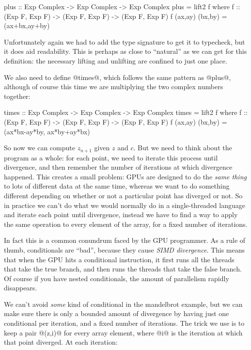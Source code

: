 \begin{haskell}
plus :: Exp Complex -> Exp Complex -> Exp Complex
plus = lift2 f
  where f :: (Exp F, Exp F) -> (Exp F, Exp F) -> (Exp F, Exp F)
        f (ax,ay) (bx,by) = (ax+bx,ay+by)
\end{haskell}

\noindent Unfortunately again we had to add the type signature to get
it to typecheck, but it does aid readability.  This is perhaps as
close to ``natural'' as we can get for this definition: the necessary
lifting and unlifting are confined to just one place.

We also need to define @times@, which follows the same pattern as
@plus@, although of course this time we are multiplying the two
complex numbers together:

\begin{haskell}
times :: Exp Complex -> Exp Complex -> Exp Complex
times = lift2 f
  where f :: (Exp F, Exp F) -> (Exp F, Exp F) -> (Exp F, Exp F)
        f (ax,ay) (bx,by)   =  (ax*bx-ay*by, ax*by+ay*bx)
\end{haskell}

So now we can compute $z_{n+1}$ given $z$ and $c$.  But we need to
think about the program as a whole: for each point, we need to iterate
this process until divergence, and then remember the number of
iterations at which divergence happened.  This creates a small
problem: GPUs are designed to do the \emph{same thing} to lots of
different data at the same time, whereas we want to do something
different depending on whether or not a particular point has diverged
or not.  So in practice we can't do what we would normally do in a
single-threaded language and iterate each point until divergence,
instead we have to find a way to apply the same operation to every
element of the array, for a fixed number of iterations.

In fact this is a common conundrum faced by the GPU programmer.  As a
rule of thumb, conditionals are ``bad'', because they cause \emph{SIMD
  divergence}.  This means that when the GPU hits a conditional
instruction, it first runs all the threads that take the true branch,
and then runs the threads that take the false branch.  Of course if
you have nested conditionals, the amount of parallelism rapidly
disappears.

We can't avoid \emph{some} kind of conditional in the mandelbrot
example, but we can make sure there is only a bounded amount of
divergence by having just one conditional per iteration, and a fixed
number of iterations.  The trick we use is to keep a pair @(z,i)@ for
every array element, where @i@ is the iteration at which that point
diverged.  At each iteration:

